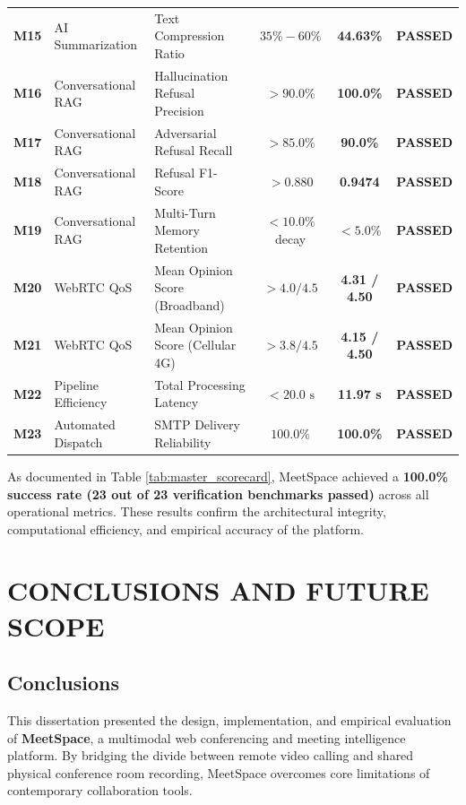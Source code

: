 \documentclass[12pt,oneside,letterpaper]{report}
\numberwithin{equation}{chapter} %
\begin{document}
\begin{table}[H]
\begin{tabularx}{\textwidth}{c p{3.5cm}p{4.5cm}c c c}
\textbf{M15} & AI Summarization & Text Compression Ratio & $35\% - 60\%$ & \textbf{44.63\%} & \textbf{PASSED} \\
\textbf{M16} & Conversational RAG & Hallucination Refusal Precision & $> 90.0\%$ & \textbf{100.0\%} & \textbf{PASSED} \\
\textbf{M17} & Conversational RAG & Adversarial Refusal Recall & $> 85.0\%$ & \textbf{90.0\%} & \textbf{PASSED} \\
\textbf{M18} & Conversational RAG & Refusal F1-Score & $> 0.880$ & \textbf{0.9474} & \textbf{PASSED} \\
\textbf{M19} & Conversational RAG & Multi-Turn Memory Retention & $< 10.0\%$ decay & \textbf{$< 5.0\%$} & \textbf{PASSED} \\
\textbf{M20} & WebRTC QoS & Mean Opinion Score (Broadband) & $> 4.0 / 4.5$ & \textbf{4.31 / 4.50} & \textbf{PASSED} \\
\textbf{M21} & WebRTC QoS & Mean Opinion Score (Cellular 4G) & $> 3.8 / 4.5$ & \textbf{4.15 / 4.50} & \textbf{PASSED} \\
\textbf{M22} & Pipeline Efficiency & Total Processing Latency & $< 20.0\text{ s}$ & \textbf{11.97 s} & \textbf{PASSED} \\
\textbf{M23} & Automated Dispatch & SMTP Delivery Reliability & $100.0\%$ & \textbf{100.0\%} & \textbf{PASSED} \\
\bottomrule
\end{tabularx}
\end{table}

As documented in Table \ref{tab:master_scorecard}, MeetSpace achieved a \textbf{100.0\% success rate (23 out of 23 verification benchmarks passed)} across all operational metrics. These results confirm the architectural integrity, computational efficiency, and empirical accuracy of the platform.

\chapter{CONCLUSIONS AND FUTURE SCOPE}

\section{Conclusions}
This dissertation presented the design, implementation, and empirical evaluation of \textbf{MeetSpace}, a multimodal web conferencing and meeting intelligence platform. By bridging the divide between remote video calling and shared physical conference room recording, MeetSpace overcomes core limitations of contemporary collaboration tools.
\end{document}
